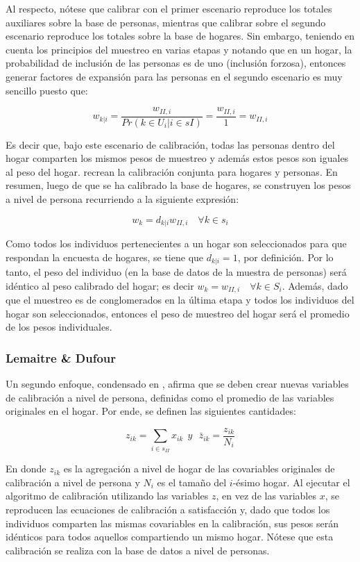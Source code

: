 \documentclass[
  12pt,
  spanish,
]{book}
\begin{document}
Al respecto, nótese que calibrar con el primer escenario reproduce los totales auxiliares sobre la base de personas, mientras que calibrar sobre el segundo escenario reproduce los totales sobre la base de hogares. Sin embargo, teniendo en cuenta los principios del muestreo en varias etapas y notando que en un hogar, la probabilidad de inclusión de las personas es de uno (inclusión forzosa), entonces generar factores de expansión para las personas en el segundo escenario es muy sencillo puesto que:

\[
w_{k|i}= \frac{w_{II,i}}{Pr(k \in U_i | i \in sI)} = \frac{w_{II,i}}{1} = w_{II,i}
\]

Es decir que, bajo este escenario de calibración, todas las personas dentro del hogar comparten los mismos pesos de muestreo y además estos pesos son iguales al peso del hogar. \citet[sec.~5]{Estevao_Sarndal_2006} recrean la calibración conjunta para hogares y personas. En resumen, luego de que se ha calibrado la base de hogares, se construyen los pesos a nivel de persona recurriendo a la siguiente expresión:

\[
w_k = d_{k|i}w_{II,i} \quad \forall k \in s_i
\]

Como todos los individuos pertenecientes a un hogar son seleccionados para que respondan la encuesta de hogares, se tiene que \(d_{k|i} = 1\), por definición. Por lo tanto, el peso del individuo (en la base de datos de la muestra de personas) será idéntico al peso calibrado del hogar; es decir \(w_k = w_{II,i} \quad \forall k \in S_i\). Además, dado que el muestreo es de conglomerados en la última etapa y todos los individuos del hogar son seleccionados, entonces el peso de muestreo del hogar será el promedio de los pesos individuales.

\hypertarget{lemaitre-dufour}{%
\subsubsection{Lemaitre \& Dufour}\label{lemaitre-dufour}}

Un segundo enfoque, condensado en \citet{Lemaitre_Dufour_1987}, afirma que se deben crear nuevas variables de calibración a nivel de persona, definidas como el promedio de las variables originales en el hogar. Por ende, se definen las siguientes cantidades:

\[
z_{ik}=\sum_{i \in s_{II}} x_{ik}\ \ y\ \ \ {\bar{z}}_{ik}=\frac{z_{ik}}{N_i}
\]

En donde \(z_{ik}\) es la agregación a nivel de hogar de las covariables originales de calibración a nivel de persona y \(N_i\) es el tamaño del \(i\)-ésimo hogar. Al ejecutar el algoritmo de calibración utilizando las variables \(z\), en vez de las variables \(x\), se reproducen las ecuaciones de calibración a satisfacción y, dado que todos los individuos comparten las mismas covariables en la calibración, sus pesos serán idénticos para todos aquellos compartiendo un mismo hogar. Nótese que esta calibración se realiza con la base de datos a nivel de personas.
\end{document}
